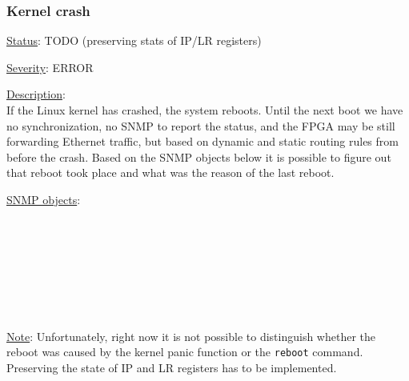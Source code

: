 \subsubsection{\bf Kernel crash}
		\begin{pck_descr}
			\item [] \underline{Status}: TODO (preserving stats of IP/LR registers)
			\item [] \underline{Severity}: ERROR
			\item [] \underline{Description}:\\
				If the Linux kernel has crashed, the system reboots. Until the next boot
				we have no synchronization, no SNMP to report the status, and the FPGA
				may be still forwarding Ethernet traffic, but based on dynamic and
				static routing rules from before the crash. Based on the SNMP objects
				below it is possible to figure out that reboot took place and what was
				the reason of the last reboot.
			\item [] \underline{SNMP objects}:\\
				{\footnotesize
				\\
				\\
				\\
				\\
				\\
				\\
				\\
				 }
			\item [] \underline{Note}:
				Unfortunately, right now it is not possible to distinguish whether the
				reboot was caused by the kernel panic function or the \texttt{reboot}
				command. Preserving the state of IP and LR registers has to be
				implemented.
		\end{pck_descr}
